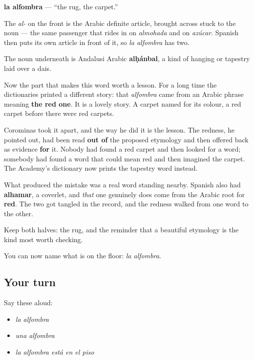 \begin{cousinweb}
\textbf{la alfombra} — \textquotedblleft{}the rug, the carpet.\textquotedblright{}

The \emph{al-} on the front is the Arabic definite article, brought across stuck to the noun — the same passenger that rides in on \emph{almohada} and on \emph{azúcar}. Spanish then puts its own article in front of it, so \emph{la alfombra} has two.

The noun underneath is Andalusi Arabic \textbf{alḥánbal}, a kind of hanging or tapestry laid over a dais.

Now the part that makes this word worth a lesson. For a long time the dictionaries printed a different story: that \emph{alfombra} came from an Arabic phrase meaning \textbf{the red one}. It is a lovely story. A carpet named for its colour, a red carpet before there were red carpets.

Corominas took it apart, and the way he did it is the lesson. The redness, he pointed out, had been read \textbf{out of} the proposed etymology and then offered back as evidence \textbf{for} it. Nobody had found a red carpet and then looked for a word; somebody had found a word that could mean red and then imagined the carpet. The Academy's dictionary now prints the tapestry word instead.

What produced the mistake was a real word standing nearby. Spanish also had \textbf{alhamar}, a coverlet, and \emph{that} one genuinely does come from the Arabic root for \textbf{red}. The two got tangled in the record, and the redness walked from one word to the other.

Keep both halves: the rug, and the reminder that a beautiful etymology is the kind most worth checking.
\end{cousinweb}

\begin{grammarlens}[title={What you've built}]
You can now name what is on the floor: \emph{la alfombra}.
\end{grammarlens}

\subsection*{Your turn}
Say these aloud:

\begin{itemize}
\raggedright
  \item \emph{la alfombra}
  \item \emph{una alfombra}
  \item \emph{la alfombra está en el piso}
\end{itemize}

